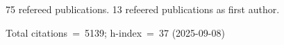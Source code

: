 75 refereed publications. 13 refeered publications as first author.

Total citations~=~5139; h-index~=~37 (2025-09-08)